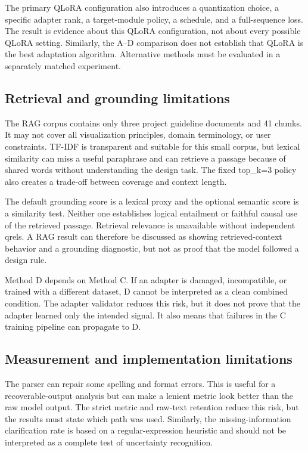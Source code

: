 The primary QLoRA configuration also introduces a quantization choice, a specific adapter rank, a target-module policy, a schedule, and a full-sequence loss. The result is evidence about this QLoRA configuration, not about every possible QLoRA setting. Similarly, the A--D comparison does not establish that QLoRA is the best adaptation algorithm. Alternative methods must be evaluated in a separately matched experiment.

\subsection{Retrieval and grounding limitations}

The RAG corpus contains only three project guideline documents and 41 chunks. It may not cover all visualization principles, domain terminology, or user constraints. TF-IDF is transparent and suitable for this small corpus, but lexical similarity can miss a useful paraphrase and can retrieve a passage because of shared words without understanding the design task. The fixed top\_k=3 policy also creates a trade-off between coverage and context length.

The default grounding score is a lexical proxy and the optional semantic score is a similarity test. Neither one establishes logical entailment or faithful causal use of the retrieved passage. Retrieval relevance is unavailable without independent qrels. A RAG result can therefore be discussed as showing retrieved-context behavior and a grounding diagnostic, but not as proof that the model followed a design rule.

Method D depends on Method C. If an adapter is damaged, incompatible, or trained with a different dataset, D cannot be interpreted as a clean combined condition. The adapter validator reduces this risk, but it does not prove that the adapter learned only the intended signal. It also means that failures in the C training pipeline can propagate to D.

\subsection{Measurement and implementation limitations}

The parser can repair some spelling and format errors. This is useful for a recoverable-output analysis but can make a lenient metric look better than the raw model output. The strict metric and raw-text retention reduce this risk, but the results must state which path was used. Similarly, the missing-information clarification rate is based on a regular-expression heuristic and should not be interpreted as a complete test of uncertainty recognition.

